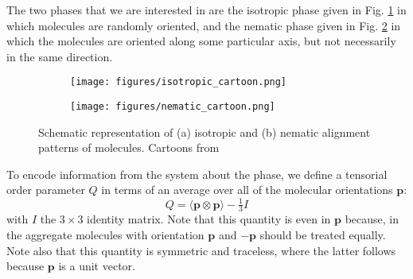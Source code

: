 \documentclass[reqno]{article}
\begin{document}
  The two phases that we are interested in are the isotropic phase given in
  Fig. \ref{fig:isotropic-cartoon} in which molecules are randomly oriented, and
  the nematic phase given in Fig. \ref{fig:nematic-cartoon} in which the
  molecules are oriented along some particular axis, but not necessarily in the
  same direction.
  \begin{figure}[h] 
    \centering
    \begin{subfigure}{0.4\textwidth}
      \texttt{[image: figures/isotropic\_cartoon.png]}
      \caption{}
      \label{fig:isotropic-cartoon}
    \end{subfigure}
    \hfill
    \begin{subfigure}{0.4\textwidth}
      \texttt{[image: figures/nematic\_cartoon.png]}
      \caption{}
      \label{fig:nematic-cartoon}
    \end{subfigure}
    \caption{Schematic representation of (a) isotropic and (b) nematic alignment
      patterns of molecules. Cartoons from ~\cite{selinger_introduction_2016}}
    \label{fig:alignment-cartoons}
  \end{figure}
  To encode information from the system about the phase, we define a tensorial
  order parameter $Q$ in terms of an average over all of the molecular
  orientations $\mathbf{p}$:
  \begin{equation} \label{eq:Q-def}
    Q = \langle \mathbf{p} \otimes \mathbf{p} \rangle - \tfrac13 I
  \end{equation}
  with $I$ the $3\times 3$ identity matrix.
  Note that this quantity is even in $\mathbf{p}$ because, in the aggregate
  molecules with orientation $\mathbf{p}$ and $-\mathbf{p}$ should be treated
  equally.
  Note also that this quantity is symmetric and traceless, where the latter
  follows because $\mathbf{p}$ is a unit vector.
\end{document}
